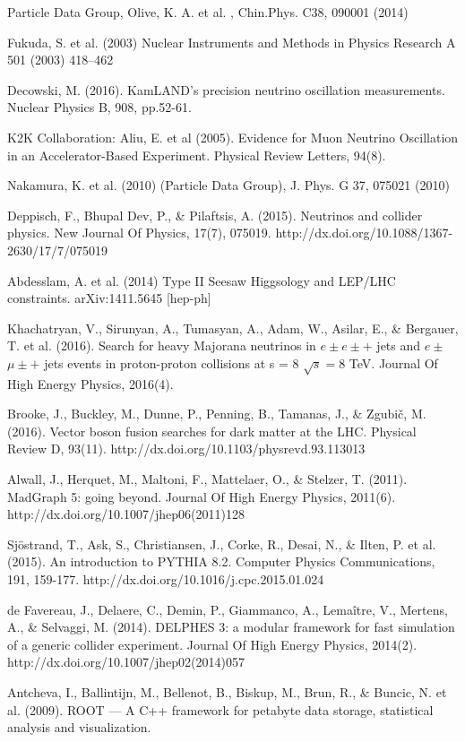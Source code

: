 \documentclass[11pt, oneside]{book}
\begin{document}
\begin{thebibliography}{10}

Particle Data Group, Olive, K. A. et al. , Chin.Phys. C38, 090001 (2014)


 Fukuda, S. et al. (2003) Nuclear Instruments and Methods in Physics Research A 501 (2003) 418–462

 Decowski, M. (2016). KamLAND's precision neutrino oscillation measurements. Nuclear Physics B, 908, pp.52-61.

 K2K Collaboration: Aliu, E. et al (2005). Evidence for Muon Neutrino Oscillation in an Accelerator-Based Experiment. Physical Review Letters, 94(8).

Nakamura, K. et al. (2010) (Particle Data Group), J. Phys. G 37, 075021 (2010) 

 Deppisch, F., Bhupal Dev, P., \& Pilaftsis, A. (2015). Neutrinos and collider physics. New Journal Of Physics, 17(7), 075019. http://dx.doi.org/10.1088/1367-2630/17/7/075019

 Abdesslam, A. et al. (2014) Type II Seesaw Higgsology and LEP/LHC constraints. arXiv:1411.5645 [hep-ph]

 Khachatryan, V., Sirunyan, A., Tumasyan, A., Adam, W., Asilar, E., \& Bergauer, T. et al. (2016). Search for heavy Majorana neutrinos in $e\pm e\pm +$ jets and $e\pm$ $\mu \pm +$ jets events in proton-proton collisions at s = 8 $\sqrt{s}=8$ TeV. Journal Of High Energy Physics, 2016(4).

 Brooke, J., Buckley, M., Dunne, P., Penning, B., Tamanas, J., \& Zgubič, M. (2016). Vector boson fusion searches for dark matter at the LHC. Physical Review D, 93(11). http://dx.doi.org/10.1103/physrevd.93.113013

 Alwall, J., Herquet, M., Maltoni, F., Mattelaer, O., \& Stelzer, T. (2011). MadGraph 5: going beyond. Journal Of High Energy Physics, 2011(6). http://dx.doi.org/10.1007/jhep06(2011)128

Sjöstrand, T., Ask, S., Christiansen, J., Corke, R., Desai, N., \& Ilten, P. et al. (2015). An introduction to PYTHIA 8.2. Computer Physics Communications, 191, 159-177. http://dx.doi.org/10.1016/j.cpc.2015.01.024

 de Favereau, J., Delaere, C., Demin, P., Giammanco, A., Lemaître, V., Mertens, A., \& Selvaggi, M. (2014). DELPHES 3: a modular framework for fast simulation of a generic collider experiment. Journal Of High Energy Physics, 2014(2). http://dx.doi.org/10.1007/jhep02(2014)057

 Antcheva, I., Ballintijn, M., Bellenot, B., Biskup, M., Brun, R., \& Buncic, N. et al. (2009). ROOT — A C++ framework for petabyte data storage, statistical analysis and visualization.

\end{thebibliography}
\end{document}
